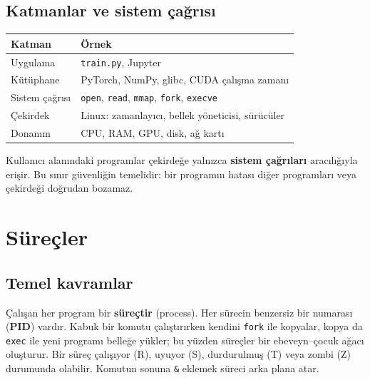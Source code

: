 \documentclass[11pt,a4paper]{article}
\begin{document}
\subsection{Katmanlar ve sistem çağrısı}
\begin{center}
\begin{tabularx}{\textwidth}{@{}l Y@{}}
\toprule
\textbf{Katman} & \textbf{Örnek} \\
\midrule
Uygulama & \texttt{train.py}, Jupyter \\
Kütüphane & PyTorch, NumPy, glibc, CUDA çalışma zamanı \\
Sistem çağrısı & \texttt{open}, \texttt{read}, \texttt{mmap}, \texttt{fork}, \texttt{execve} \\
Çekirdek & Linux: zamanlayıcı, bellek yöneticisi, sürücüler \\
Donanım & CPU, RAM, GPU, disk, ağ kartı \\
\bottomrule
\end{tabularx}
\end{center}
Kullanıcı alanındaki programlar çekirdeğe yalnızca \textbf{sistem çağrıları} aracılığıyla erişir. Bu sınır güvenliğin temelidir: bir programın hatası diğer programları veya çekirdeği doğrudan bozamaz.

\section{Süreçler}

\subsection{Temel kavramlar}
Çalışan her program bir \textbf{süreçtir} (process). Her sürecin benzersiz bir numarası (\textbf{PID}) vardır. Kabuk bir komutu çalıştırırken kendini \texttt{fork} ile kopyalar, kopya da \texttt{exec} ile yeni programı belleğe yükler; bu yüzden süreçler bir ebeveyn–çocuk ağacı oluşturur. Bir süreç çalışıyor (R), uyuyor (S), durdurulmuş (T) veya zombi (Z) durumunda olabilir. Komutun sonuna \texttt{\&} eklemek süreci arka plana atar.
\end{document}
